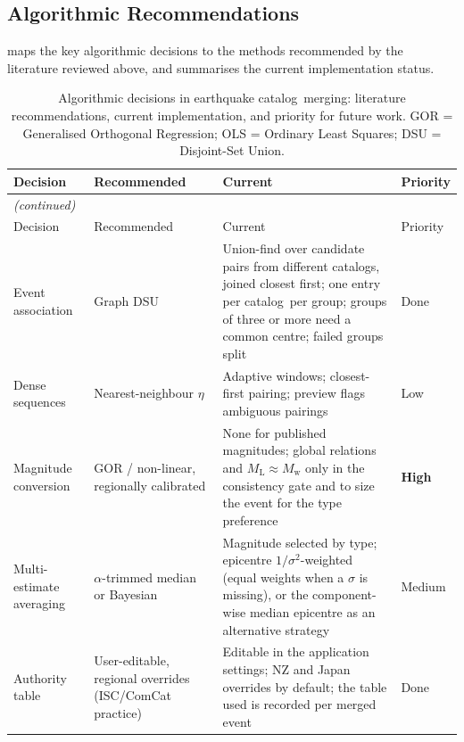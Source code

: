 \documentclass[12pt]{article}
\newcommand{\catalog}{catalog}
\newcommand{\catalogs}{catalogs}
\begin{document}
\subsection{Algorithmic Recommendations}
\label{sec:recommendations}

 maps the key algorithmic decisions to the methods
recommended by the literature reviewed above, and summarises the current
implementation status.

\begin{longtable}{p{2.8cm}p{3.3cm}p{3.5cm}p{1.5cm}}
  \caption{Algorithmic decisions in earthquake \catalog\ merging:
           literature recommendations, current implementation, and priority for
           future work.  GOR = Generalised Orthogonal Regression;
           OLS = Ordinary Least Squares; DSU = Disjoint-Set Union.}
  \label{tab:recommendations} \\
  \toprule
  Decision & Recommended & Current & Priority \\
  \midrule
  \endfirsthead
  \multicolumn{4}{l}{\small\textit{(continued)}} \\
  \toprule
  Decision & Recommended & Current & Priority \\
  \midrule
  \endhead
  \bottomrule
  \endfoot
  Event association & Graph DSU \citep{Patton2016} & Union-find over candidate pairs from different \catalogs, joined closest first; one entry per \catalog\ per group; groups of three or more need a common centre; failed groups split & Done \\
  Dense sequences & Nearest-neighbour $\eta$ \citep{Tanaka2022} & Adaptive windows; closest-first pairing; preview flags ambiguous pairings & Low \\
  Magnitude conversion & GOR / non-linear, regionally calibrated \citep{Grunthal2016, ISCGEM2018} & None for published magnitudes; global relations \citep{Scordilis2006} and $M_\mathrm{L} \approx M_\mathrm{w}$ only in the consistency gate and to size the event for the type preference & \textbf{High} \\
  Multi-estimate averaging & $\alpha$-trimmed median \citep{ISCGEM2018} or Bayesian \citep{Si2024} & Magnitude selected by type; epicentre $1/\sigma^2$-weighted (equal weights when a $\sigma$ is missing), or the component-wise median epicentre as an alternative strategy & Medium \\
  Authority table & User-editable, regional overrides (ISC/ComCat practice) & Editable in the application settings; NZ and Japan overrides by default; the table used is recorded per merged event & Done \\

\end{longtable}
\end{document}
